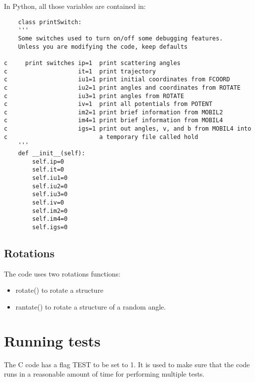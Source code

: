 \documentclass[letter,12pt]{article}
\begin{document}
In Python, all those variables are contained in:
\begin{verbatim}
    class printSwitch:
    '''    
    Some switches used to turn on/off some debugging features.
    Unless you are modifying the code, keep defaults

c     print switches ip=1  print scattering angles
c                    it=1  print trajectory
c                    iu1=1 print initial coordinates from FCOORD
c                    iu2=1 print angles and coordinates from ROTATE 
c                    iu3=1 print angles from ROTATE
c                    iv=1  print all potentials from POTENT
c                    im2=1 print brief information from MOBIL2
c                    im4=1 print brief information from MOBIL4
c                    igs=1 print out angles, v, and b from MOBIL4 into 
c                          a temporary file called hold
    '''
    def __init__(self):
        self.ip=0
        self.it=0
        self.iu1=0
        self.iu2=0
        self.iu3=0
        self.iv=0
        self.im2=0
        self.im4=0
        self.igs=0

\end{verbatim}


\subsection{Rotations}
The code uses two rotations functions:
\begin{itemize}
    \item rotate() to rotate a structure
    \item rantate() to rotate a structure of a random angle.
\end{itemize}

\section{Running tests}
The C code has a flag TEST to be set to 1. It is used to make sure that the code runs in a reasonable amount of time for performing multiple tests.
\end{document}
